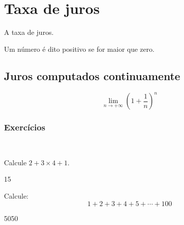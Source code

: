 
\setlength{\headheight}{30pt} %
\chapter{Taxa de juros}\label{cap_introducao}

A taxa de juros.

\begin{defn}
    Um número é dito positivo se for maior que zero.
\end{defn}

\section{Juros computados continuamente}\label{sec_juros_continuos}

\begin{equation}
    \lim_{n\to +\infty} \left(1+\frac{1}{n}\right)^n
\end{equation}

\subsection*{Exercícios}
~
\begin{exer} Calcule $2 + 3\times 4 + 1$.
\end{exer}
\begin{resp}
15
\end{resp}

\begin{exer} Calcule:
    \begin{equation}
        1 + 2 + 3 + 4 + 5 + \cdots + 100
    \end{equation}
\end{exer}
\begin{resp}
    5050
\end{resp}
    

